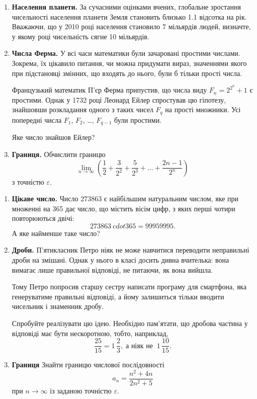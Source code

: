 \begin{enumerate}
\item \textbf{Населення планети.} За сучасними оцінками вчених, глобальне зростання чисельності населення планети Земля становить близько 1.1 відсотка на рік. Вважаючи, що у 2010 році населення становило 7 мільярдів людей, визначте, у якому році чисельність сягне 10 мільярдів.
\item \textbf{Числа Ферма.} У всі часи математики були зачаровані простими числами. Зокрема, їх цікавило питання, чи можна придумати вираз, значеннями якого при підстановці змінних, що входять до нього, були б тільки прості числа.

Французький математик П'єр Ферма припустив, що числа виду $F_n = 2^{2^n}+1$ є простими. Однак у 1732 році Леонард Ейлер спростував цю гіпотезу, знайшовши розкладання одного з таких чисел $F_q$ на прості множники. Усі попередні числа $F_1$, $F_2$, \ldots, $F_{q-1}$ були простими.

Яке число знайшов Ейлер?
\item \textbf{Границя.} Обчислити границю
$$
\lim_{n\to\infty} \left(\frac{1}{2}+\frac{3}{2^2}+\frac{5}{2^3}+\ldots+\frac{2n-1}{2^n}\right)
$$
з точністю $\varepsilon$.
\end{enumerate}




\begin{enumerate}
\item \textbf{Цікаве число.} Число 273863 є найбільшим натуральним числом, яке при множенні на 365 дає число, що містить вісім цифр, з яких перші чотири повторюються двічі:
$$
273863 \ cdot365 = 99959995.
$$
А яке найменше таке число?
\item \textbf{Дроби.} П'ятикласник Петро ніяк не може навчитися переводити неправильні дроби на змішані. Однак у нього в класі досить дивна вчителька: вона вимагає лише правильної відповіді, не питаючи, як вона вийшла.

Тому Петро попросив старшу сестру написати програму для смартфона, яка генеруватиме правильні відповіді, а йому залишиться тільки вводити чисельник і знаменник дробу.

Спробуйте реалізувати цю ідею. Необхідно пам'ятати, що дробова частина у відповіді має бути нескоротною, тобто, наприклад,
$$
\frac{25}{15}=1\,\frac{2}{3}, \;\text{а ніяк не} \; \; 1\,\frac{10}{15}.
$$
\item \textbf{Границя} Знайти границю числової послідовності
$$
a_n=\frac{n^2+4n}{2n^2+5}
$$
при $n\to\infty$ із заданою точністю $\varepsilon$.
\end{enumerate}



